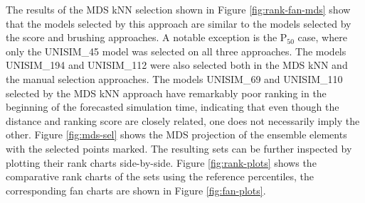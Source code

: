 \documentclass[final,5p,times,twocolumn]{elsarticle}
\begin{document}
The results of the MDS kNN selection shown in Figure \ref{fig:rank-fan-mds} show that the models selected by this approach are similar to the models selected by the score and brushing approaches. A notable exception is the P$_{50}$ case, where only the UNISIM\_45 model was selected on all three approaches. The models UNISIM\_194 and UNISIM\_112 were also selected both in the MDS kNN and the manual selection approaches. The models UNISIM\_69 and UNISIM\_110 selected by the MDS kNN approach have remarkably poor ranking in the beginning of the forecasted simulation time, indicating that even though the distance and ranking score are closely related, one does not necessarily imply the other. Figure \ref{fig:mds-sel} shows the MDS projection of the ensemble elements with the selected points marked. The resulting sets can be further inspected by plotting their rank charts side-by-side. Figure \ref{fig:rank-plots} shows the comparative rank charts of the sets using the reference percentiles, the corresponding fan charts are shown in Figure \ref{fig:fan-plots}.
\end{document}
